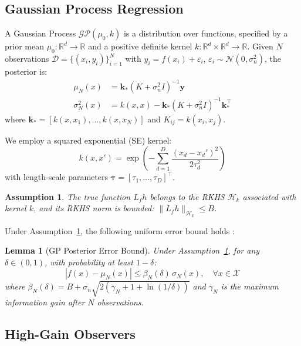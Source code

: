 \documentclass[letterpaper, 10 pt, conference]{ieeeconf}
\newtheorem{lemma}[theorem]{Lemma}
\newtheorem{assumption}{Assumption}
\begin{document}
\subsection{Gaussian Process Regression}

A Gaussian Process $\mathcal{GP}(\mu_0, k)$ is a distribution over functions, specified by a prior mean $\mu_0: \mathbb{R}^d \to \mathbb{R}$ and a positive definite kernel $k: \mathbb{R}^d \times \mathbb{R}^d \to \mathbb{R}$. Given $N$ observations $\mathcal{D} = \{(x_i, y_i)\}_{i=1}^N$ with $y_i = f(x_i) + \varepsilon_i$, $\varepsilon_i \sim \mathcal{N}(0, \sigma_n^2)$, the posterior is:
\begin{align}
    \mu_N(x) &= \bm{k}_*(K + \sigma_n^2 I)^{-1} \bm{y} \label{eq:gp_mean}\\
    \sigma_N^2(x) &= k(x,x) - \bm{k}_*(K + \sigma_n^2 I)^{-1} \bm{k}_*^\top \label{eq:gp_var}
\end{align}
where $\bm{k}_* = [k(x, x_1), \ldots, k(x, x_N)]$ and $K_{ij} = k(x_i, x_j)$.

We employ a squared exponential (SE) kernel:
\begin{equation}\label{eq:se_kernel}
    k(x, x') = \exp\left(-\sum_{d=1}^{D} \frac{(x_d - x_d')^2}{2\tau_d^2}\right)
\end{equation}
with length-scale parameters $\bm{\tau} = [\tau_1, \ldots, \tau_D]^\top$.

\begin{assumption}\label{ass:rkhs}
The true function $L_f h$ belongs to the RKHS $\mathcal{H}_k$ associated with kernel $k$, and its RKHS norm is bounded: $\|L_f h\|_{\mathcal{H}_k} \leq B$.
\end{assumption}

Under Assumption~\ref{ass:rkhs}, the following uniform error bound holds \cite{lederer2019uniform, srinivas2010gpucb}:
\begin{lemma}[GP Posterior Error Bound]\label{lem:gp_bound}
Under Assumption~\ref{ass:rkhs}, for any $\delta \in (0,1)$, with probability at least $1 - \delta$:
\begin{equation}\label{eq:gp_error_bound}
    |f(x) - \mu_N(x)| \leq \beta_N(\delta) \, \sigma_N(x), \quad \forall x \in \mathcal{X}
\end{equation}
where $\beta_N(\delta) = B + \sigma_n \sqrt{2(\gamma_N + 1 + \ln(1/\delta))}$ and $\gamma_N$ is the maximum information gain after $N$ observations.
\end{lemma}

\subsection{High-Gain Observers}
\end{document}
